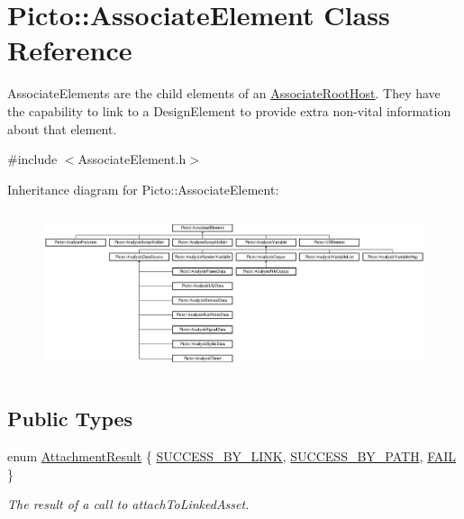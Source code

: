\hypertarget{class_picto_1_1_associate_element}{\section{Picto\-:\-:Associate\-Element Class Reference}
\label{class_picto_1_1_associate_element}
}


Associate\-Elements are the child elements of an \hyperlink{class_picto_1_1_associate_root_host}{Associate\-Root\-Host}. They have the capability to link to a Design\-Element to provide extra non-\/vital information about that element.  




{\ttfamily \#include $<$Associate\-Element.\-h$>$}

Inheritance diagram for Picto\-:\-:Associate\-Element\-:\begin{figure}[H]
\begin{center}
\leavevmode
\includegraphics[height=4.810997cm]{class_picto_1_1_associate_element}
\end{center}
\end{figure}
\subsection*{Public Types}
\begin{DoxyCompactItemize}
\item 
enum \hyperlink{class_picto_1_1_associate_element_a4748629e8da6dae94a635082c340f512}{Attachment\-Result} \{ \hyperlink{class_picto_1_1_associate_element_a4748629e8da6dae94a635082c340f512a5c79c7c2de09b1964905dbc0110a18d0}{S\-U\-C\-C\-E\-S\-S\-\_\-\-B\-Y\-\_\-\-L\-I\-N\-K}, 
\hyperlink{class_picto_1_1_associate_element_a4748629e8da6dae94a635082c340f512a2f276070b9137fef8bec4b18bfe3774c}{S\-U\-C\-C\-E\-S\-S\-\_\-\-B\-Y\-\_\-\-P\-A\-T\-H}, 
\hyperlink{class_picto_1_1_associate_element_a4748629e8da6dae94a635082c340f512ab99881ca4135841db0fde767429d3e42}{F\-A\-I\-L}
 \}
\begin{DoxyCompactList}\small\item\em The result of a call to attach\-To\-Linked\-Asset. \end{DoxyCompactList}\end{DoxyCompactItemize}
